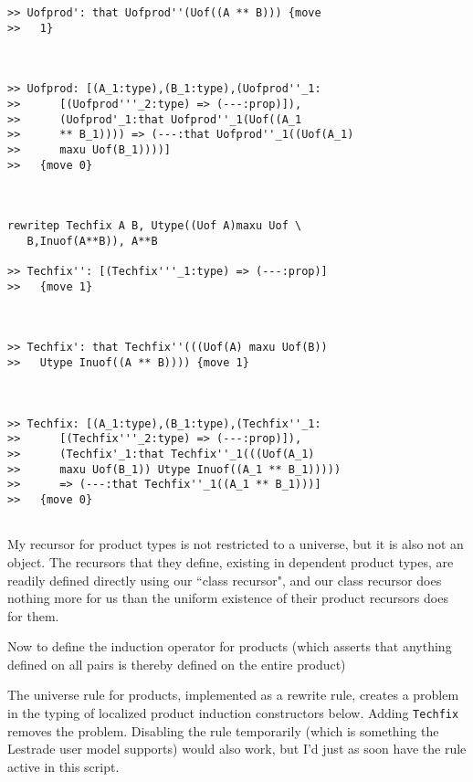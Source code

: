 \documentclass{article}
\begin{document}
\begin{verbatim}
>> Uofprod': that Uofprod''(Uof((A ** B))) {move
>>   1}



>> Uofprod: [(A_1:type),(B_1:type),(Uofprod''_1:
>>      [(Uofprod'''_2:type) => (---:prop)]),
>>      (Uofprod'_1:that Uofprod''_1(Uof((A_1
>>      ** B_1)))) => (---:that Uofprod''_1((Uof(A_1)
>>      maxu Uof(B_1))))]
>>   {move 0}



rewritep Techfix A B, Utype((Uof A)maxu Uof \
   B,Inuof(A**B)), A**B

>> Techfix'': [(Techfix'''_1:type) => (---:prop)]
>>   {move 1}



>> Techfix': that Techfix''(((Uof(A) maxu Uof(B))
>>   Utype Inuof((A ** B)))) {move 1}



>> Techfix: [(A_1:type),(B_1:type),(Techfix''_1:
>>      [(Techfix'''_2:type) => (---:prop)]),
>>      (Techfix'_1:that Techfix''_1(((Uof(A_1)
>>      maxu Uof(B_1)) Utype Inuof((A_1 ** B_1)))))
>>      => (---:that Techfix''_1((A_1 ** B_1)))]
>>   {move 0}


\end{verbatim}

My recursor for product types is not restricted to a universe, but it is also not an object.  The recursors that they define, existing in dependent product
types, are readily defined directly using our ``class recursor", and our class recursor does nothing more for us than the uniform existence of their 
product recursors does for them.

Now to define the induction operator for products (which asserts that anything defined on all pairs is thereby defined on the entire product)

The universe rule for products, implemented as a rewrite rule, creates a problem in the typing of localized product induction constructors below.
Adding {\tt Techfix} removes the problem.  Disabling the rule temporarily (which is something the Lestrade user model supports) would also work,
but I'd just as soon have the rule active in this script.
\end{document}
